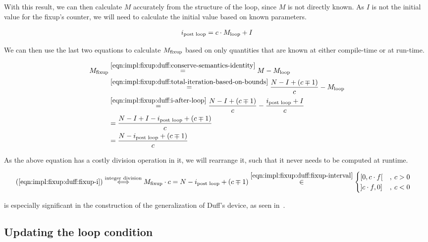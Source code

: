 With this result, we can then calculate $M$ accurately from the structure of the loop, since $M$ is not directly known.
As $I$ is not the initial value for the fixup's counter, we will need to calculate the initial value based on known parameters.

\begin{equation}\label{eqn:impl:fixup:duff:i-after-loop}
\begin{aligned}
    i_\text{post loop} = c \cdot M_{\text{loop}} + I
\end{aligned}
\end{equation}

We can then use the last two equations to calculate $M_{\text{fixup}}$ based on only quantities that are known at either compile-time or at run-time.

\begin{equation}\label{eqn:impl:fixup:duff:fixup-i}
\begin{aligned}
    M_{\text{fixup}} & \overset{\ref{eqn:impl:fixup:duff:conserve-semantics-identity}}{=} M - M_{\text{loop}} \\
    & \overset{\ref{eqn:impl:fixup:duff:total-iteration-based-on-bounds}}{=}
    \frac{N - I + (c \mp 1)}{c} - M_{\text{loop}} \\
    & \overset{\ref{eqn:impl:fixup:duff:i-after-loop}}{=}
    \frac{N - I + (c \mp 1)}{c} - \frac{i_\text{post loop} + I}{c} \\
    &= \frac{N - I + I - i_\text{post loop} + (c \mp 1)}{c}\\
    &= \frac{N - i_\text{post loop} + (c \mp 1)}{c}
\end{aligned}
\end{equation}

As the above equation has a costly division operation in it, we will rearrange it, such that it never needs to be computed at runtime.

\begin{equation}\label{eqn:impl:fixup:duff:fixup-i-mult}
\begin{aligned}
    (\ref{eqn:impl:fixup:duff:fixup-i}) &\overset{\text{integer division}}{\Longleftrightarrow} M_{\text{fixup}} \cdot c = N - i_\text{post loop} + (c \mp 1) \overset{\ref{eqn:impl:fixup:duff:fixup-interval}}{\in}  \begin{cases} \lbrack 0, c \cdot f \lbrack &, \medspace c > 0\\ \rbrack c \cdot f, 0 \rbrack &, \medspace c < 0 \end{cases} 
\end{aligned}
\end{equation}

 is especially significant in the construction of the generalization of Duff's device, as seen in~.

\subsection{Updating the loop condition}\label{sec:impl:fixup:header-cond}


